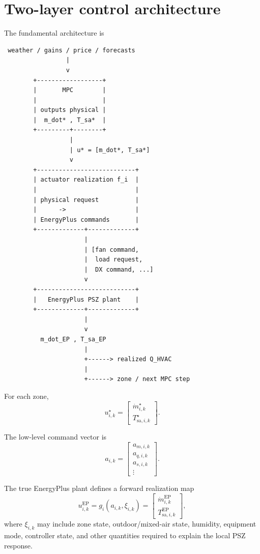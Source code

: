 \documentclass[11pt]{article}
\newcommand{\mdot}{\dot m}
\begin{document}
\section{Two-layer control architecture}

The fundamental architecture is

\begin{verbatim}
 weather / gains / price / forecasts
                 |
                 v
        +------------------+
        |       MPC        |
        |                  |
        | outputs physical |
        |  m_dot* , T_sa*  |
        +---------+--------+
                  |
                  | u* = [m_dot*, T_sa*]
                  v
        +---------------------------+
        | actuator realization f_i  |
        |                           |
        | physical request          |
        |      ->                   |
        | EnergyPlus commands       |
        +-------------+-------------+
                      |
                      | [fan command,
                      |  load request,
                      |  DX command, ...]
                      v
        +---------------------------+
        |   EnergyPlus PSZ plant    |
        +-------------+-------------+
                      |
                      v
          m_dot_EP , T_sa_EP
                      |
                      +------> realized Q_HVAC
                      |
                      +------> zone / next MPC step
\end{verbatim}

For each zone,
\begin{equation}
u_{i,k}^\star
=
\begin{bmatrix}
\mdot_{i,k}^\star\\
T_{\mathrm{sa},i,k}^\star
\end{bmatrix}.
\label{eq:physical-mpc-input}
\end{equation}

The low-level command vector is
\begin{equation}
a_{i,k}
=
\begin{bmatrix}
a_{m,i,k}\\
a_{q,i,k}\\
a_{s,i,k}\\
\vdots
\end{bmatrix}.
\label{eq:low-level-actuator-vector}
\end{equation}

The true EnergyPlus plant defines a forward realization map
\begin{equation}
u_{i,k}^{\mathrm{EP}}
=
g_i(a_{i,k},\xi_{i,k})
=
\begin{bmatrix}
\mdot_{i,k}^{\mathrm{EP}}\\
T_{\mathrm{sa},i,k}^{\mathrm{EP}}
\end{bmatrix},
\label{eq:forward-realization-map}
\end{equation}
where $\xi_{i,k}$ may include zone state, outdoor/mixed-air state, humidity,
equipment mode, controller state, and other quantities required to explain the
local PSZ response.
\end{document}
